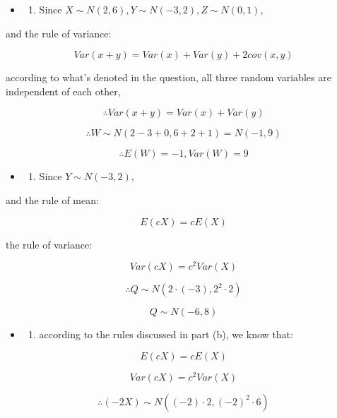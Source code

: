 \documentclass[11pt]{article}
\providecommand{\tightlist}{%
      \setlength{\itemsep}{0pt}\setlength{\parskip}{0pt}}
\begin{document}
    \begin{itemize}
\item
  \begin{enumerate}
  \def\labelenumi{(\alph{enumi})}
  \tightlist
  \item
    Since \(X \sim N(2, 6), Y \sim N(-3, 2), Z \sim N(0, 1)\),
  \end{enumerate}
\end{itemize}

and the rule of variance:

\[Var(x+y) = Var(x) + Var(y) + 2cov(x,y)\]

according to what's denoted in the question, all three random variables
are independent of each other,

\[\therefore Var(x+y) = Var(x) + Var(y)\]

\[\therefore W \sim N(2-3+0, 6+2+1) = N(-1, 9)\]

\[\therefore E(W) = -1, Var(W) = 9\]

    \begin{itemize}
\item
  \begin{enumerate}
  \def\labelenumi{(\alph{enumi})}
  \setcounter{enumi}{1}
  \tightlist
  \item
    Since \(Y \sim N(-3, 2)\),
  \end{enumerate}
\end{itemize}

and the rule of mean:

\[E(cX) = cE(X)\]

the rule of variance:

\[Var(cX) = c^2 Var(X)\]

\[\therefore Q \sim N(2 \cdot (-3), 2^2 \cdot 2)\]

\[Q \sim N(-6, 8)\]

    \begin{itemize}
\item
  \begin{enumerate}
  \def\labelenumi{(\alph{enumi})}
  \setcounter{enumi}{2}
  \tightlist
  \item
    according to the rules discussed in part (b), we know that:
  \end{enumerate}
\end{itemize}

\[E(cX) = cE(X)\]

\[Var(cX) = c^2 Var(X)\]

\[\therefore (-2X) \sim N((-2) \cdot 2, (-2)^2 \cdot 6)\]
\end{document}
